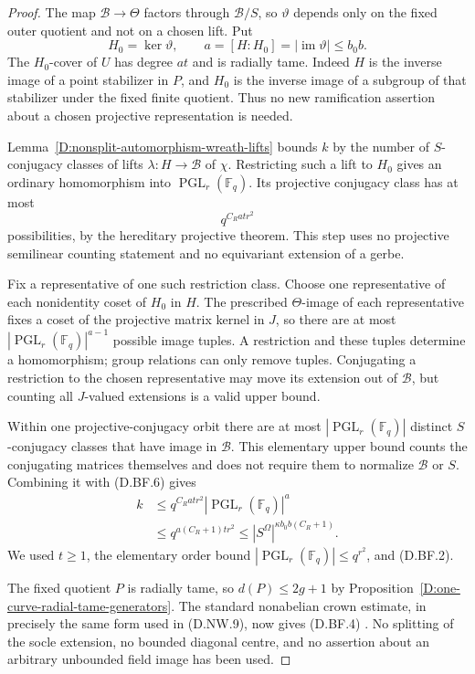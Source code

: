 \begin{proof}
The map $\mathcal B\to\Theta$ factors through
$\mathcal B/S$, so $\vartheta$ depends only on the fixed
outer quotient and not on a chosen lift. Put
\[
       H_0=\ker\vartheta,\qquad
       a=[H:H_0]=|\operatorname{im}\vartheta|\leq b_0b.
                                                               \tag{D.BF.5}
\]
The $H_0$-cover of $U$ has degree $at$ and is radially
tame. Indeed $H$ is the inverse image of a point stabilizer
in $P$, and $H_0$ is the inverse image of a subgroup
of that stabilizer under the fixed finite quotient. Thus no new ramification assertion about a
chosen projective representation is needed.

Lemma~\ref{D:nonsplit-automorphism-wreath-lifts} bounds
$k$ by the number of $S$-conjugacy classes of lifts
$\lambda:H\to\mathcal B$ of $\chi$. Restricting such a
lift to $H_0$ gives an ordinary homomorphism into
$\operatorname{PGL}_r(\mathbb F_q)$. Its projective
conjugacy class has at most
\[
                              q^{C_Rat r^2}                    \tag{D.BF.6}
\]
possibilities, by the hereditary projective theorem.
This step uses no projective semilinear counting
statement and no equivariant extension of a gerbe.

Fix a representative of one such restriction class.
Choose one representative of each nonidentity coset
of $H_0$ in $H$. The prescribed $\Theta$-image of each
representative fixes a coset of the projective matrix
kernel in $J$, so there are at most
$|\operatorname{PGL}_r(\mathbb F_q)|^{a-1}$ possible
image tuples. A restriction and these tuples determine
a homomorphism; group relations can only remove tuples.
Conjugating a restriction to the chosen representative
may move its extension out of $\mathcal B$, but counting
all $J$-valued extensions is a valid upper bound.

Within one projective-conjugacy orbit there are at most
$|\operatorname{PGL}_r(\mathbb F_q)|$ distinct
$S$-conjugacy classes that have image in $\mathcal B$.
This elementary upper bound counts the conjugating
matrices themselves and does not require them to
normalize $\mathcal B$ or $S$. Combining it with
(D.BF.6) gives
\[
 \begin{split}
 k&\leq q^{C_Rat r^2}
                 |\operatorname{PGL}_r(\mathbb F_q)|^{a}\\
  &\leq q^{a(C_R+1)t r^2}
   \leq |S^\Omega|^{\kappa b_0b(C_R+1)}.
 \end{split}                                                   \tag{D.BF.7}
\]
We used $t\geq1$, the elementary order bound
$|\operatorname{PGL}_r(\mathbb F_q)|\leq q^{r^2}$,
and (D.BF.2).

The fixed quotient $P$ is radially tame, so
$d(P)\leq2g+1$ by
Proposition~\ref{D:one-curve-radial-tame-generators}.
The standard nonabelian crown estimate, in precisely
the same form used in (D.NW.9), now gives (D.BF.4)
\citep[proof of Proposition2.6(ii), pp.~11--13,
including (2.1)--(2.2)]{LucchiniMarionTracey2020D}.
No splitting of the socle extension, no bounded diagonal
centre, and no assertion about an arbitrary unbounded
field image has been used.
\end{proof}
